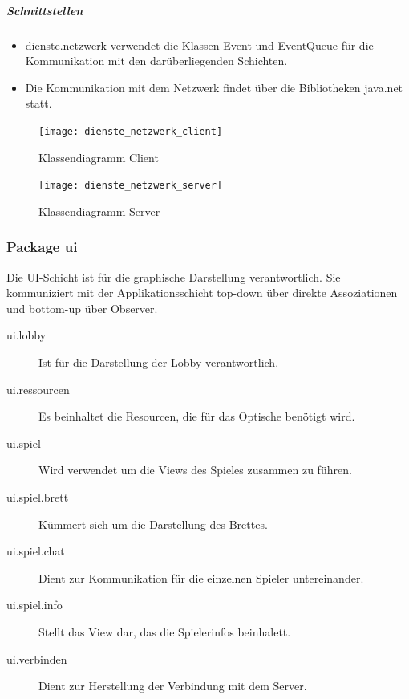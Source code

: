 \documentclass[12pt,halfparskip]{scrartcl}
\begin{document}
\subparagraph{Schnittstellen} %
\label{ssub:schnittstellen}
\begin{itemize}
	\item dienste.netzwerk verwendet die Klassen Event und EventQueue für die Kommunikation mit den darüberliegenden Schichten.
	\item Die Kommunikation mit dem Netzwerk findet über die Bibliotheken java.net statt.
\end{itemize}

\begin{figure}[h]
	\centering
	\texttt{[image: dienste\_netzwerk\_client]}
	\caption{Klassendiagramm Client}
	\label{fig:dienste_netzwerk_client}
\end{figure}

\begin{figure}[h]
	\centering
	\texttt{[image: dienste\_netzwerk\_server]}
	\caption{Klassendiagramm Server}
	\label{fig:dienste_netzwerk_server}
\end{figure}


\clearpage
\subsubsection{Package ui} %
\label{ssub:package_ui}
Die UI-Schicht ist für die graphische Darstellung verantwortlich. Sie kommuniziert mit der Applikationsschicht top-down über direkte Assoziationen und bottom-up über Observer.

\begin{description}
	\item[ui.lobby] Ist für die Darstellung der Lobby verantwortlich.
	\item[ui.ressourcen] Es beinhaltet die Resourcen, die für das Optische benötigt wird.
	\item[ui.spiel] Wird verwendet um die Views des Spieles zusammen zu führen.
	\item[ui.spiel.brett] Kümmert sich um die Darstellung des Brettes.
	\item[ui.spiel.chat] Dient zur Kommunikation für die einzelnen Spieler untereinander.
	\item[ui.spiel.info] Stellt das View dar, das die Spielerinfos beinhalett.
	\item[ui.verbinden] Dient zur Herstellung der Verbindung mit dem Server.
\end{description}
\end{document}
